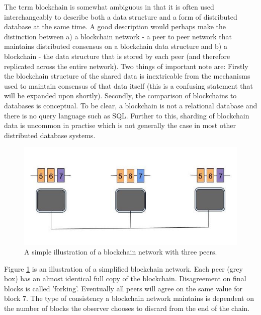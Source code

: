 The term blockchain is somewhat ambiguous in that it is often used interchangeably to describe both a data structure and a form of distributed database at the same time. A good description would perhaps make the distinction between a) a blockchain network - a peer to peer network that maintains distributed consensus on a blockchain data structure and b) a blockchain - the data structure that is stored by each peer (and therefore replicated across the entire network). Two things of important note are: Firstly the blockchain structure of the shared data is inextricable from the mechanisms used to maintain consensus of that data itself (this is a confusing statement that will be expanded upon shortly). Secondly, the comparison of blockchains to databases is conceptual. To be clear, a blockchain is not a relational database and there is no query language such as SQL. Further to this, sharding of blockchain data is uncommon in practise which is not generally the case in most other distributed database systems\cite{Shard}. \\

\begin{figure}
\centering
\includegraphics[width=\textwidth]{Figures/basic_chain}
\decoRule
\caption[Simplified Blockchain Network]{A simple illustration of a blockchain network with three peers.}
\label{fig:basic_chain}
\end{figure}

Figure \ref{fig:basic_chain} is an illustration of a simplified blockchain network. Each peer (grey box) has an almost identical full copy of the blockchain. Disagreement on final blocks is called 'forking'. Eventually all peers will agree on the same value for block 7. The type of consistency a blockchain network maintains is dependent on the number of blocks the observer chooses to discard from the end of the chain\cite{Bitcoin_consistency}. \\

